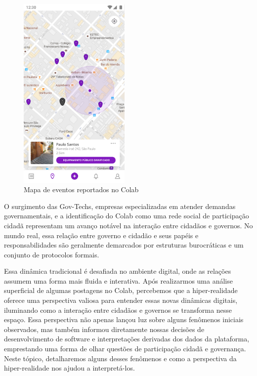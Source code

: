 \begin{figure}[!htb]
	\centering
	\includegraphics[width=0.48\textwidth]{images/colab_app_map.png}
	\caption{Mapa de eventos reportados no Colab}
	\label{fig:colab_app_map}
\end{figure}

O surgimento das Gov-Techs, empresas especializadas em atender demandas governamentais, e a identificação do Colab como uma rede social de participação cidadã representam um avanço notável na interação entre cidadãos e governos. No mundo real, essa relação entre governo e cidadão e seus papéis e responsabilidades são geralmente demarcados por estruturas burocráticas e um conjunto de protocolos formais.

Essa dinâmica tradicional é desafiada no ambiente digital, onde as relações assumem uma forma mais fluida e interativa. Após realizarmos uma análise superficial de algumas postagens no Colab, percebemos que a hiper-realidade oferece uma perspectiva valiosa para entender essas novas dinâmicas digitais, iluminando como a interação entre cidadãos e governos se transforma nesse espaço. Essa perspectiva não apenas lançou luz sobre alguns fenômenos iniciais observados, mas também informou diretamente nossas decisões de desenvolvimento de software e interpretações derivadas dos dados da plataforma, emprestando uma forma de olhar questões de participação cidadã e governança. Neste tópico, detalharemos alguns desses fenômenos e como a perspectiva da hiper-realidade nos ajudou a interpretá-los.

